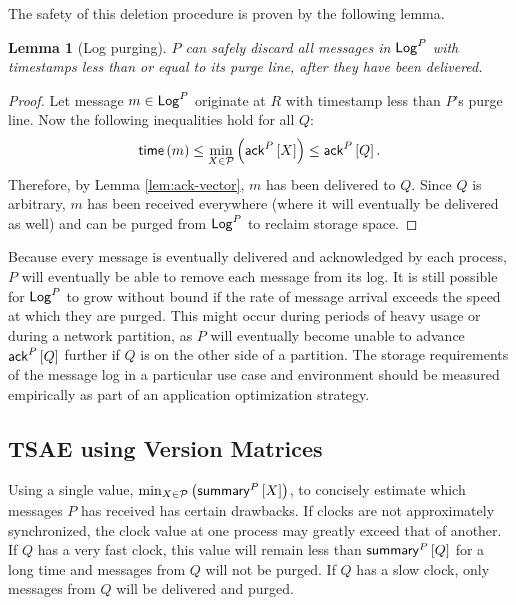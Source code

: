 \documentclass[]             %
{NASA}                       %
\newtheorem{lemma}[theorem]{Lemma}
\theoremstyle{definition}
\begin{document}
The safety of this deletion procedure is proven by the following
lemma.
\begin{lemma}[Log purging]
  \label{lem:purge}
  $P$ can safely discard all messages in $\mathsf{Log}^{P}$ with timestamps less
  than or equal to its purge line, after they have been delivered.
\end{lemma}
\begin{proof}
  Let message $m \in \mathsf{Log}^{P}$ originate at $R$ with timestamp less than
  $P$'s purge line. Now the following inequalities hold for all $Q$:
  \[ \mathsf{time}\left(m\right) \leq \min_{X \in \mathcal{P}}\left(\mathsf{ack}^{P}\left[X\right]\right)
    \leq \mathsf{ack}^{P}\left[Q\right].\] Therefore, by Lemma \ref{lem:ack-vector}, $m$
  has been delivered to $Q$. Since $Q$ is arbitrary, $m$ has been
  received everywhere (where it will eventually be delivered as well)
  and can be purged from $\mathsf{Log}^{P}$ to reclaim storage space.
\end{proof}

Because every message is eventually delivered and acknowledged by each
process, $P$ will eventually be able to remove each message from its
log. It is still possible for $\mathsf{Log}^{P}$ to grow without bound if the
rate of message arrival exceeds the speed at which they are
purged. This might occur during periods of heavy usage or during a
network partition, as $P$ will eventually become unable to advance
$\mathsf{ack}^{P}\left[Q\right]$ further if $Q$ is on the other side of a partition. The
storage requirements of the message log in a particular use case and
environment should be measured empirically as part of an application
optimization strategy.

\subsection{TSAE using Version Matrices}
\label{ssec:tsae-unsynchronized}
Using a single value,
$\min_{X \in \mathcal{P}} \left(\mathsf{summary}^{P}\left[X\right]\right)$, to concisely
estimate which messages $P$ has received has certain drawbacks. If
clocks are not approximately synchronized, the clock value at one
process may greatly exceed that of another. If $Q$ has a very fast
clock, this value will remain less than $\mathsf{summary}^{P}\left[Q\right]$ for a long
time and messages from $Q$ will not be purged. If $Q$ has a slow
clock, only messages from $Q$ will be delivered and purged.
\end{document}
